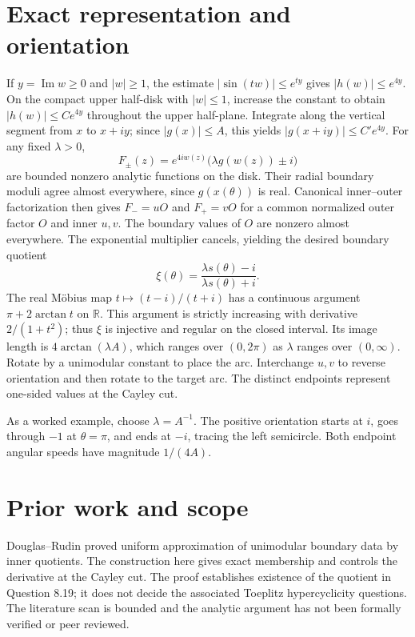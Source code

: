 \documentclass[11pt]{amsart}
\begin{document}
\section{Exact representation and orientation}
If \(y=\operatorname{Im}w\ge0\) and \(|w|\ge1\), the estimate \(|\sin(tw)|\le e^{ty}\) gives \(|h(w)|\le e^{4y}\). On the compact upper half-disk with \(|w|\le1\), increase the constant to obtain \(|h(w)|\le C e^{4y}\) throughout the upper half-plane. Integrate along the vertical segment from \(x\) to \(x+iy\); since \(|g(x)|\le A\), this yields \(|g(x+iy)|\le C'e^{4y}\). For any fixed \(\lambda>0\),
\[
 F_\pm(z)=e^{4iw(z)}\bigl(\lambda g(w(z))\pm i\bigr)
\]
are bounded nonzero analytic functions on the disk. Their radial boundary moduli agree almost everywhere, since \(g(x(\theta))\) is real. Canonical inner--outer factorization \cite{duren} then gives \(F_-=uO\) and \(F_+=vO\) for a common normalized outer factor \(O\) and inner \(u,v\). The boundary values of \(O\) are nonzero almost everywhere. The exponential multiplier cancels, yielding the desired boundary quotient
\[
 \xi(\theta)=\frac{\lambda s(\theta)-i}{\lambda s(\theta)+i}.
\]
The real M\"obius map \(t\mapsto(t-i)/(t+i)\) has a continuous argument \(\pi+2\arctan t\) on \(\mathbb R\). This argument is strictly increasing with derivative \(2/(1+t^2)\); thus \(\xi\) is injective and regular on the closed interval. Its image length is \(4\arctan(\lambda A)\), which ranges over \((0,2\pi)\) as \(\lambda\) ranges over \((0,\infty)\). Rotate by a unimodular constant to place the arc. Interchange \(u,v\) to reverse orientation and then rotate to the target arc. The distinct endpoints represent one-sided values at the Cayley cut.

As a worked example, choose \(\lambda=A^{-1}\). The positive orientation starts at \(i\), goes through \(-1\) at \(\theta=\pi\), and ends at \(-i\), tracing the left semicircle. Both endpoint angular speeds have magnitude \(1/(4A)\).

\section{Prior work and scope}
Douglas--Rudin \cite{douglas} proved uniform approximation of unimodular boundary data by inner quotients. The construction here gives exact membership and controls the derivative at the Cayley cut. The proof establishes existence of the quotient in Question 8.19; it does not decide the associated Toeplitz hypercyclicity questions. The literature scan is bounded and the analytic argument has not been formally verified or peer reviewed.



\end{document}
